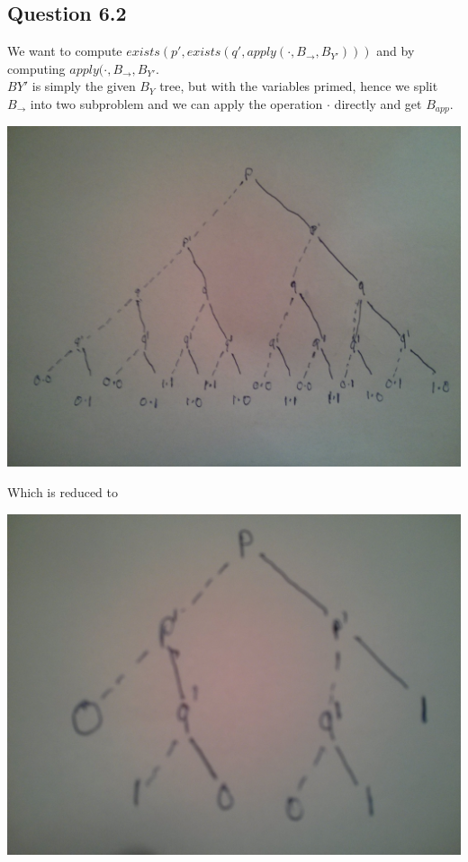 \documentclass[12pt]{article}
\begin{document}
\subsection*{Question 6.2}
We want to compute $exists(p',exists(q',apply(\cdot,B_{\rightarrow},B_{Y'})))$ and by computing $apply(\cdot,B_{\rightarrow},B_{Y'}$.\\
$B{Y'}$ is simply the given $B_Y$ tree, but with the variables primed, hence we split $B_{\rightarrow}$ into two subproblem and we can apply the operation $\cdot$ directly and get $B_{app}$.
\begin{center}
\includegraphics[scale=0.1]{10}
\end{center}
Which is reduced to
\begin{center}
\includegraphics[scale=0.1]{11}
\end{center}
\end{document}
